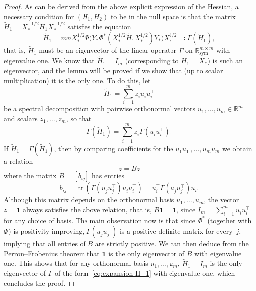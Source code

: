 \documentclass[10pt,a4paper]{amsart}
\DeclareMathOperator{\tr}{tr}
\newcommand{\R}{\mathbb{R}}
\begin{document}
\begin{proof}
As can be derived from the above explicit expression of the Hessian, a necessary condition for $(H_1,H_2)$ to be in the null space is that the matrix $\tilde H_1 = X_*^{-1/2} H_1 X_*^{-1/2}$ satisfies the equation
\[
 \tilde H_1 = mn X_*^{1/2} \Phi \big( Y_* \Phi^*(X_*^{1/2} \tilde H_1 X_*^{1/2}) Y_* \big) X_*^{1/2} \eqqcolon \Gamma( \tilde H_1 ),
\]
that is, $\tilde H_1$ must be an eigenvector of the linear operator $\Gamma$ on $\R^{m \times m}_{\mathrm{sym}}$ with eigenvalue one. We know that $\tilde H_1 = I_m$ (corresponding to $H_1 = X_*$) is such an eigenvector, and the lemma will be proved if we show that (up to scalar multiplication) it is the only one. To do this, let
\begin{equation}\label{eq:expansion H_1}
 \tilde H_1 = \sum_{i=1}^m z_i^{} u_i^{} u_i^\top
\end{equation}
be a spectral decomposition with pairwise orthonormal vectors $u_1,\dots,u_m \in \R^m$ and scalars $z_1,\dots,z_m$, so that
\[
 \Gamma(\tilde H_1) = \sum_{i=1}^m z_i^{} \Gamma(u_i^{} u_i^\top).
\]
If $\tilde H_1 = \Gamma(\tilde H_1)$, then by comparing coefficients for the $u_1^{} u_1^\top,\dots,u_m^{} u_m^\top$ we obtain a relation
\[
 z = B z
\]
where the matrix $B = [b_{ij}]$ has entries
\[
 b_{ij} = \tr(\Gamma(u_j^{} u_j^\top) u_i^{} u_i^\top) = u_i^\top \Gamma(u_j^{} u_j^\top) u_i.
\]
Although this matrix depends on the orthonormal basis $u_1,\dots,u_m$, the vector $z = \mathbf 1$ always satisfies the above relation, that is, $B \mathbf 1 = \mathbf 1$, since $I_m = \sum_{i=1}^m u_i^{} u_i^\top$ for any choice of basis. The main observation now is that since $\Phi^*$ (together with $\Phi$) is positivity improving, $\Gamma(u_j^{} u_j^\top)$ is a positive definite matrix for every~$j$, implying that all entries of $B$ are strictly positive. We can then deduce from the Perron--Frobenius theorem that $\mathbf 1$ is the only eigenvector of $B$ with eigenvalue one. This shows that for any orthonormal basis $u_1,\dots,u_m$, $\tilde H_1 = I_m$ is the only eigenvector of $\Gamma$ of the form~\eqref{eq:expansion H_1} with eigenvalue one, which concludes the proof.
\end{proof}
\end{document}
